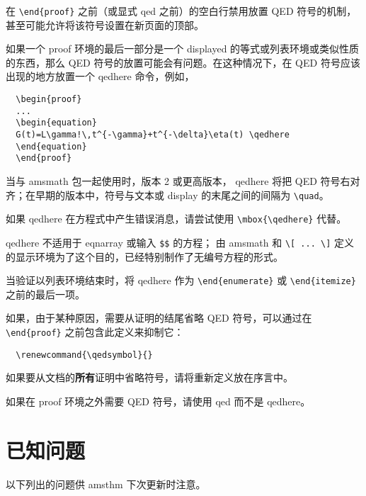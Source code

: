 \documentclass[11pt,twoside,fontset=sikou,punct=kaiming]{ctexart}
\renewcommand{\emph}[1]{\textbf{#1}}
\newcommand{\ntt}{%
  \ttfamily\mdseries\upshape%
}
\DeclareRobustCommand{\cn}[1]{{\ntt\bslchar#1}}
\DeclareRobustCommand{\pkg}[1]{{\ntt#1}}
\DeclareRobustCommand{\env}[1]{{\ntt#1}}
\providecommand{\qedsymbol}{\leavevmode
  \hbox to.77778em{%
  \hfil\vrule
  \vbox to.675em{\hrule width.6em\vfil\hrule}%
  \vrule\hfil}}
\begin{document}
在 \verb+\end{proof}+ 之前（或显式 \cn{qed} 之前）的空白行禁用放置 QED 符号的机制，甚至可能允许将该符号设置在新页面的顶部。

如果一个 \env{proof} 环境的最后一部分是一个 displayed 的等式或列表环境或类似性质的东西，那么 QED 符号的放置可能会有问题。在这种情况下，在 QED 符号应该出现的地方放置一个 \cn{qedhere} 命令，例如，
\begin{verbatim}
  \begin{proof}
  ...
  \begin{equation}
  G(t)=L\gamma!\,t^{-\gamma}+t^{-\delta}\eta(t) \qedhere
  \end{equation}
  \end{proof}
\end{verbatim}
当与 \pkg{amsmath} 包一起使用时，版本 2 或更高版本，\cn{qedhere} 将把 QED 符号右对齐；在早期的版本中，符号与文本或 display 的末尾之间的间隔为 \verb+\quad+。

如果 \cn{qedhere} 在方程式中产生错误消息，请尝试使用 \verb+\mbox{\qedhere}+ 代替。

\cn{qedhere} 不适用于 \env{eqnarray} 或输入 \verb+$$+ 的方程；
由 \pkg{amsmath} 和 \verb+\[ ... \]+ 定义的显示环境为了这个目的，已经特别制作了无编号方程的形式。

当验证以列表环境结束时，将 \cn{qedhere} 作为 \verb+\end{enumerate}+ 或 \verb+\end{itemize}+ 之前的最后一项。

如果，由于某种原因，需要从证明的结尾省略 QED 符号，可以通过在 \verb+\end{proof}+ 之前包含此定义来抑制它：
\begin{verbatim}
  \renewcommand{\qedsymbol}{}
\end{verbatim}
如果要从文档的\emph{所有}证明中省略符号，请将重新定义放在序言中。

如果在 \env{proof} 环境之外需要 QED 符号，请使用 \cn{qed} 而不是 \cn{qedhere}。



\section{已知问题}

以下列出的问题供 \pkg{amsthm} 下次更新时注意。
\end{document}
